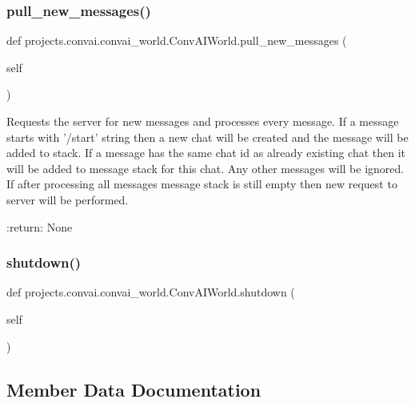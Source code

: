 \subsubsection{\texorpdfstring{pull\+\_\+new\+\_\+messages()}{pull\_new\_messages()}}
{\footnotesize\ttfamily def projects.\+convai.\+convai\+\_\+world.\+Conv\+A\+I\+World.\+pull\+\_\+new\+\_\+messages (\begin{DoxyParamCaption}\item[{}]{self }\end{DoxyParamCaption})}

\begin{DoxyVerb}Requests the server for new messages and processes every message. If a message
starts with '/start' string then a new chat will be created and the message will
be added to stack. If a message has the same chat id as already existing chat
then it will be added to message stack for this chat. Any other messages will be
ignored. If after processing all messages message stack is still empty then new
request to server will be performed.

:return: None
\end{DoxyVerb}
 \mbox{\label{classprojects_1_1convai_1_1convai__world_1_1ConvAIWorld_a4a87579d3693ce3e07f940b66567a7d3}} 
\subsubsection{\texorpdfstring{shutdown()}{shutdown()}}
{\footnotesize\ttfamily def projects.\+convai.\+convai\+\_\+world.\+Conv\+A\+I\+World.\+shutdown (\begin{DoxyParamCaption}\item[{}]{self }\end{DoxyParamCaption})}



\subsection{Member Data Documentation}
\mbox{\label{classprojects_1_1convai_1_1convai__world_1_1ConvAIWorld_a77dfb285968a495ecafb14ef51c18875}} 
